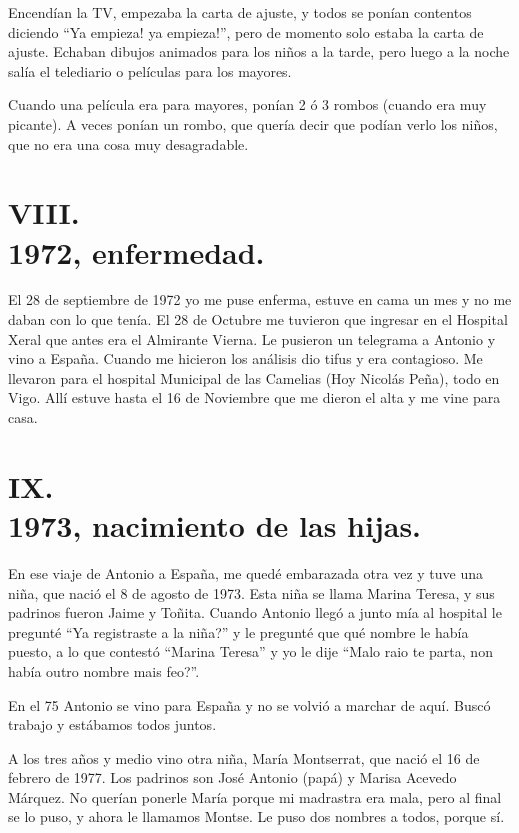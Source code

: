 \documentclass[12pt,a5paper]{book}
\begin{document}
Encendían la TV, empezaba la carta de ajuste, y todos se ponían contentos diciendo “Ya empieza! ya empieza!”, pero de momento solo estaba la carta de ajuste. Echaban dibujos animados para los niños a la tarde, pero luego a la noche salía el telediario o películas para los mayores.

Cuando una película era para mayores, ponían 2 ó 3 rombos (cuando era muy picante). A veces ponían un rombo, que quería decir que podían verlo los niños, que no era una cosa muy desagradable.



\section*{VIII.\\1972, enfermedad.}

El 28 de septiembre de 1972 yo me puse enferma, estuve en cama un mes y no me daban con lo que tenía. El 28 de Octubre me tuvieron que ingresar en el Hospital Xeral que antes era el Almirante Vierna. Le pusieron un telegrama a Antonio y vino a España. Cuando me hicieron los análisis dio tifus y era contagioso. Me llevaron para el hospital Municipal de las Camelias (Hoy Nicolás Peña), todo en Vigo. Allí estuve hasta el 16 de Noviembre que me dieron el alta y me vine para casa.


\section*{IX.\\1973, nacimiento de las hijas.}

En ese viaje de Antonio a España, me quedé embarazada otra vez y tuve una niña, que nació el 8 de agosto de 1973. Esta niña se llama Marina Teresa, y sus padrinos fueron Jaime y Toñita. Cuando Antonio llegó a junto mía al hospital le pregunté “Ya registraste a la niña?” y le pregunté que qué nombre le había puesto, a lo que contestó “Marina Teresa” y yo le dije “Malo raio te parta, non había outro nombre mais feo?”.

En el 75 Antonio se vino para España y no se volvió a marchar de aquí. Buscó trabajo y estábamos todos juntos.

A los tres años y medio vino otra niña, María Montserrat, que nació el 16 de febrero de 1977. Los padrinos son José Antonio (papá) y Marisa Acevedo Márquez. No querían ponerle María porque mi madrastra era mala, pero al final se lo puso, y ahora le llamamos Montse. Le puso dos nombres a todos, porque sí.
\end{document}
